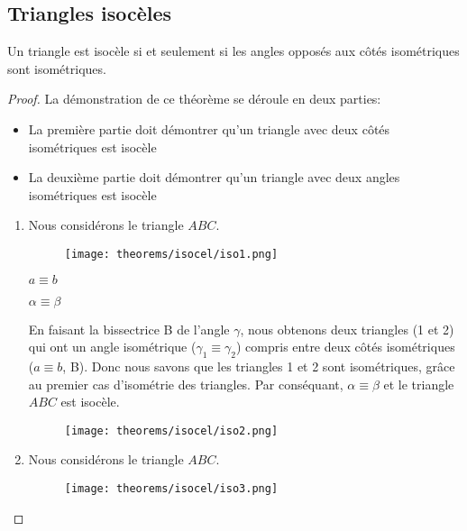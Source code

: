 \documentclass[a4paper,12pt]{article}
\begin{document}
\pagebreak
\subsection{Triangles isocèles}
\begin{theorem}
Un triangle est isocèle si et seulement si les angles opposés aux côtés isométriques sont isométriques.
\end{theorem}

\begin{proof}
La démonstration de ce théorème se déroule en deux parties:
\begin{itemize}
    \item La première partie doit démontrer qu'un triangle avec deux côtés isométriques est isocèle
    \item La deuxième partie doit démontrer qu'un triangle avec deux angles isométriques est isocèle
    \end{itemize}

    \begin{enumerate}
        \item Nous considérons le triangle $ABC$.
        \begin{figure}[H]
        \centering
        \texttt{[image: theorems/isocel/iso1.png]}
    \end{figure}
    
    
    \begin{hyp}
    $a\equiv b$
    \end{hyp}
    \begin{concl}
    $\alpha \equiv \beta$
    \end{concl}
    En faisant la bissectrice B de l'angle $\gamma$, nous obtenons deux triangles (1 et 2) qui ont un angle isométrique ($\gamma_1 \equiv \gamma_2$) compris entre deux côtés isométriques ($a\equiv b$, B). Donc nous savons que les triangles 1 et 2 sont isométriques, grâce au premier cas d'isométrie des triangles. Par conséquant, $\alpha \equiv \beta$ et le triangle $ABC$ est isocèle.
    
    
    \begin{figure}[H]
        \centering
        \texttt{[image: theorems/isocel/iso2.png]}
    \end{figure}
    
    
    
    
    \item Nous considérons le triangle $ABC$.
    \begin{figure}[H]
            \centering
            \texttt{[image: theorems/isocel/iso3.png]}
    \end{figure}


\end{enumerate}
\end{proof}
\end{document}
